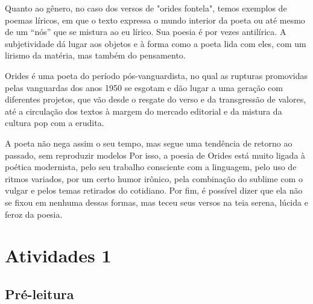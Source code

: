 \documentclass[12pt]{extarticle}
\begin{document}
Quanto ao gênero, no caso dos versos de "orides fontela", temos exemplos de poemas líricos, em que o texto expressa o mundo interior da poeta ou até mesmo de um ``nós'' 
que se mistura ao eu lírico.
Sua poesia é por vezes antilírica.
A subjetividade dá lugar aos objetos e à forma como a poeta lida com eles, 
com um lirismo da matéria, mas também do pensamento.

Orides é uma poeta do período pós-vanguardista, no qual as rupturas promovidas pelas vanguardas dos anos 1950 se esgotam e dão lugar a uma geração com diferentes projetos,
que vão desde o resgate do verso e da transgressão de valores, até a circulação dos textos à margem do mercado editorial e da mistura da cultura pop com a erudita.

A poeta não nega assim o seu tempo,
mas segue uma tendência de retorno ao passado,
sem reproduzir modelos
Por isso, a poesia de Orides está muito ligada à poética modernista, 
pelo seu trabalho consciente com a linguagem,
pelo uso de ritmos variados,
por um certo humor irônico,
pela combinação do sublime com o vulgar
e pelos temas retirados do cotidiano.
Por fim, é possível dizer que ela não se fixou em nenhuma dessas formas, 
mas teceu seus versos na teia serena, lúcida e feroz da poesia.


	
\section{Atividades 1}


\subsection{Pré-leitura}
\end{document}

